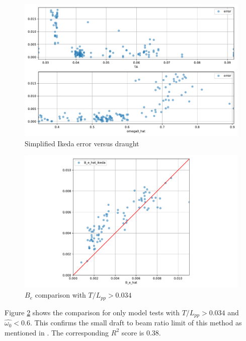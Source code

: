 \begin{figure}[H]
    \centering
    \includegraphics[width=0.9\columnwidth]{figures/B_e_hat_error.pdf}
    \caption{Simplified Ikeda error versus draught}
    \label{fig:B_e_hat_error}
\end{figure}

\begin{figure}[H]
    \centering
    \includegraphics[width=0.9\columnwidth]{figures/B_e_hat_good.pdf}
    \caption{$\hat{B_e}$ comparison with $T/L_{pp}>0.034$}
    \label{fig:B_e_hat_good}
\end{figure}

Figure \ref{fig:B_e_hat_good} shows the comparison for only model tests with $T/L_{pp}>0.034$ and $\hat{\omega_0} < 0.6$.
This confirms the small draft to beam ratio limit of this method as mentioned in \parencite{kawahara_simple_2011}. The corresponding $R^2$ score is 0.38.

